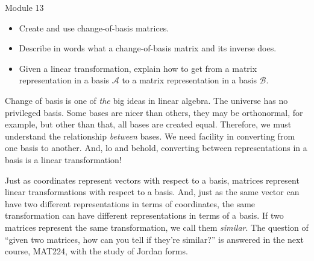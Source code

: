 \documentclass{workbook}
\begin{document}
\begin{lesson}

	Module 13

	\begin{itemize}
		\item Create and use change-of-basis matrices.
		\item Describe in words what a change-of-basis matrix and its inverse does.
		\item Given a linear transformation, explain how to get from a matrix representation in a basis $\mathcal A$
			to a matrix representation in a basis $\mathcal B$.
	\end{itemize}

	Change of basis is one of \emph{the} big ideas in linear algebra. The universe has no
	privileged basis. Some bases are nicer than others, they may be orthonormal, for example, but
	other than that, all bases are created equal. Therefore, we must understand the relationship
	\emph{between} bases. We need facility in converting from one basis to another. And, lo and behold,
	converting between representations in a basis is a linear transformation!

	Just as coordinates represent vectors with respect to a basis, matrices represent
	linear transformations with respect to a basis. And, just as the same vector can
	have two different representations in terms of coordinates, the same transformation
	can have different representations in terms of a basis. If two matrices represent the
	same transformation, we call them \emph{similar}. The question of ``given two
	matrices, how can you tell if they're similar?'' is answered in the next course, MAT224, with
	the study of Jordan forms.

\end{lesson}
\end{document}
